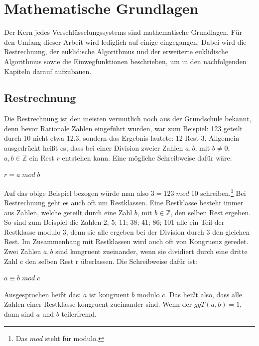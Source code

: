 \documentclass[a4paper,12pt,titlepage]{article}
\begin{document}
\section{Mathematische Grundlagen}
Der Kern jedes Verschlüsselungssystems sind mathematische Grundlagen. Für den Umfang dieser Arbeit wird lediglich auf einige eingegangen. Dabei wird die Restrechnung, der euklidische Algorithmus und der erweiterte euklidische Algorithmus sowie die Einwegfunktionen beschrieben, um in den nachfolgenden Kapiteln darauf aufzubauen.
\subsection{Restrechnung}
Die Restrechnung ist den meisten vermutlich noch aus der Grundschule bekannt, denn bevor Rationale Zahlen eingeführt wurden, war zum Beispiel: 123 geteilt durch 10 nicht etwa 12.3, sondern das Ergebnis lautete: 12 Rest 3. Allgemein ausgedrückt heißt es, dass bei einer Division zweier Zahlen $a,b$, mit $b \neq 0$, $a,b \in \mathbb{Z}$ ein Rest $r$ entstehen kann. Eine mögliche Schreibweise dafür wäre: \newline
\begin{center}
$r = a \; mod \; b$
\end{center}
Auf das obige Beispiel bezogen würde man also $3 = 123 \; mod \; 10$ schreiben.\footnote{Das $mod$ steht für modulo.} \newline Bei Restrechnung geht es auch oft um Restklassen. Eine Restklasse besteht immer aus Zahlen, welche geteilt durch eine Zahl $b$, mit $b \in \mathbb{Z}$, den selben Rest ergeben. So sind zum Beispiel die Zahlen 2; 5; 11; 38; 41; 86; 101 alle ein Teil der Restklasse modulo 3, denn sie alle ergeben bei der Division durch 3 den gleichen Rest. Im Zusammenhang mit Restklassen wird auch oft von Kongruenz geredet. Zwei Zahlen $a, b$ sind kongruent zueinander, wenn sie dividiert durch eine dritte Zahl c den selben Rest r überlassen. Die Schreibweise dafür ist: \newline
 \begin{center}
$a \equiv b \; mod \; c$
 \end{center}
Ausgesprochen heißt das: $a$ ist kongruent $b$ modulo $c$.
Das heißt also, dass alle Zahlen einer Restklasse kongruent zueinander sind.
Wenn der $ggT(a, b) = 1$, dann sind $a$ und $b$ teilerfremd.
\end{document}
